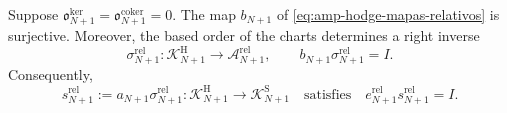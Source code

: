 \begin{lemma}
\label{lem:amp-hodge-sobreyectividad-relativa}
Suppose
\(\mathfrak o_{N+1}^{\ker}
=\mathfrak o_{N+1}^{\mathrm{coker}}=0\).
The map \(b_{N+1}\) of
\eqref{eq:amp-hodge-mapas-relativos} is surjective. Moreover, the based
order of the charts determines a right inverse
\begin{equation}\label{eq:amp-hodge-sigma-relativa}
 \sigma_{N+1}^{\mathrm{rel}}:
 \mathscr K^{\mathrm H}_{N+1}\longrightarrow
 \mathscr A_{N+1}^{\mathrm{rel}},
 \qquad
 b_{N+1}\sigma_{N+1}^{\mathrm{rel}}=I.
\end{equation}
Consequently,
\begin{equation}\label{eq:amp-hodge-seccion-relativa}
 s_{N+1}^{\mathrm{rel}}
 :=a_{N+1}\sigma_{N+1}^{\mathrm{rel}}:
 \mathscr K^{\mathrm H}_{N+1}\longrightarrow
 \mathscr K^{\mathrm S}_{N+1}
 \quad\text{satisfies}\quad
 e_{N+1}^{\mathrm{rel}}s_{N+1}^{\mathrm{rel}}=I.
\end{equation}
\end{lemma}


